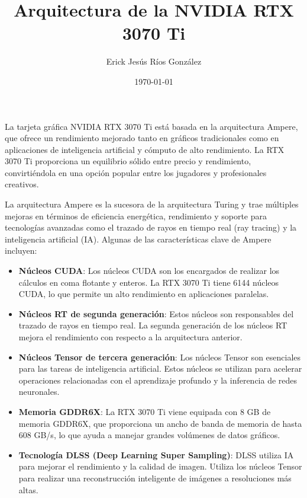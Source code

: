 \documentclass{article}
\title{Arquitectura de la NVIDIA RTX 3070 Ti}
\author{Erick Jesús Ríos González}
\date{\today}
\begin{document}
\maketitle


La tarjeta gráfica NVIDIA RTX 3070 Ti está basada en la arquitectura Ampere, que ofrece un rendimiento mejorado tanto en gráficos tradicionales como en aplicaciones de inteligencia artificial y cómputo de alto rendimiento. La RTX 3070 Ti proporciona un equilibrio sólido entre precio y rendimiento, convirtiéndola en una opción popular entre los jugadores y profesionales creativos.

La arquitectura Ampere es la sucesora de la arquitectura Turing y trae múltiples mejoras en términos de eficiencia energética, rendimiento y soporte para tecnologías avanzadas como el trazado de rayos en tiempo real (ray tracing) y la inteligencia artificial (IA). Algunas de las características clave de Ampere incluyen:

\begin{itemize}
    \item \textbf{Núcleos CUDA}: Los núcleos CUDA son los encargados de realizar los cálculos en coma flotante y enteros. La RTX 3070 Ti tiene 6144 núcleos CUDA, lo que permite un alto rendimiento en aplicaciones paralelas.
    
    \item \textbf{Núcleos RT de segunda generación}: Estos núcleos son responsables del trazado de rayos en tiempo real. La segunda generación de los núcleos RT mejora el rendimiento con respecto a la arquitectura anterior.
    
    \item \textbf{Núcleos Tensor de tercera generación}: Los núcleos Tensor son esenciales para las tareas de inteligencia artificial. Estos núcleos se utilizan para acelerar operaciones relacionadas con el aprendizaje profundo y la inferencia de redes neuronales.
    
    \item \textbf{Memoria GDDR6X}: La RTX 3070 Ti viene equipada con 8 GB de memoria GDDR6X, que proporciona un ancho de banda de memoria de hasta 608 GB/s, lo que ayuda a manejar grandes volúmenes de datos gráficos.
    
    \item \textbf{Tecnología DLSS (Deep Learning Super Sampling)}: DLSS utiliza IA para mejorar el rendimiento y la calidad de imagen. Utiliza los núcleos Tensor para realizar una reconstrucción inteligente de imágenes a resoluciones más altas.
\end{itemize}
\end{document}
